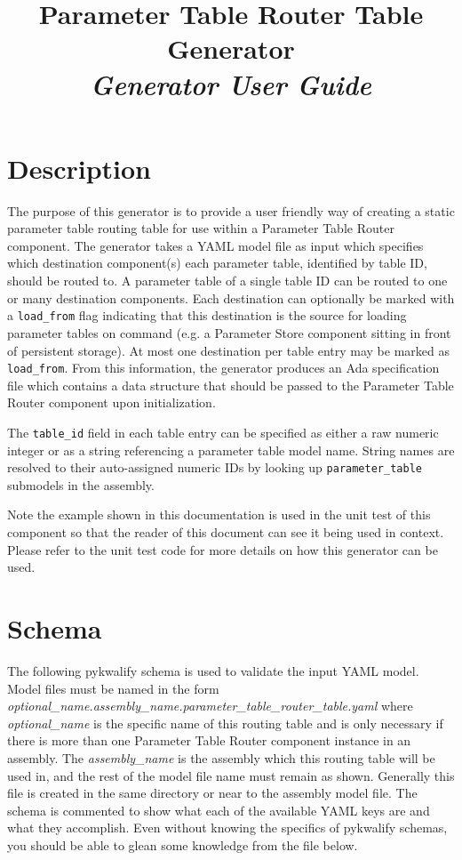 



\title{\textbf{Parameter Table Router Table Generator} \\
\large\textit{Generator User Guide}}
\date{}
\maketitle

\section{Description}

The purpose of this generator is to provide a user friendly way of creating a static parameter table routing table for use within a Parameter Table Router component. The generator takes a YAML model file as input which specifies which destination component(s) each parameter table, identified by table ID, should be routed to. A parameter table of a single table ID can be routed to one or many destination components. Each destination can optionally be marked with a \texttt{load\_from} flag indicating that this destination is the source for loading parameter tables on command (e.g. a Parameter Store component sitting in front of persistent storage). At most one destination per table entry may be marked as \texttt{load\_from}. From this information, the generator produces an Ada specification file which contains a data structure that should be passed to the Parameter Table Router component upon initialization.

The \texttt{table\_id} field in each table entry can be specified as either a raw numeric integer or as a string referencing a parameter table model name. String names are resolved to their auto-assigned numeric IDs by looking up \texttt{parameter\_table} submodels in the assembly.

Note the example shown in this documentation is used in the unit test of this component so that the reader of this document can see it being used in context. Please refer to the unit test code for more details on how this generator can be used.

\section{Schema}

The following pykwalify schema is used to validate the input YAML model. Model files must be named in the form \textit{optional\_name.assembly\_name.parameter\_table\_router\_table.yaml} where \textit{optional\_name} is the specific name of this routing table and is only necessary if there is more than one Parameter Table Router component instance in an assembly. The \textit{assembly\_name} is the assembly which this routing table will be used in, and the rest of the model file name must remain as shown. Generally this file is created in the same directory or near to the assembly model file. The schema is commented to show what each of the available YAML keys are and what they accomplish. Even without knowing the specifics of pykwalify schemas, you should be able to glean some knowledge from the file below.

